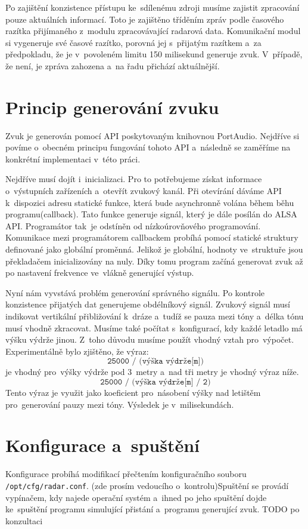 	Po zajištění konzistence přístupu ke~sdílenému zdroji musíme zajistit zpracování pouze aktuálních informací. Toto je zajištěno tříděním zpráv podle časového razítka přijímaného z~modulu zpracovávající radarová data. Komunikační modul si vygeneruje své časové razítko, porovná jej s~přijatým razítkem a~za předpokladu, že je v~povoleném limitu 150 milisekund generuje zvuk. V~případě, že není, je zpráva zahozena a~na řadu přichází aktuálnější.
 	
	\section{Princip generování zvuku}
	Zvuk je generován pomocí API poskytovaným knihovnou PortAudio. Nejdříve si povíme o~obecném principu fungování tohoto API a~následně se zaměříme na konkrétní implementaci v~této práci.\par
	Nejdříve musí dojít i~inicializaci. Pro to potřebujeme získat informace o~výstupních zařízeních a~otevřít zvukový kanál. Při otevírání dáváme API k~dispozici adresu statické funkce, která bude asynchronně volána během běhu programu(callback). Tato funkce generuje signál, který je dále posílán do ALSA API. Programátor tak~je odstíněn od nízkoúrovňového programování. Komunikace mezi programátorem callbackem probíhá pomocí statické struktury definované jako globální proměnná. Jelikož je globální, hodnoty ve~struktuře jsou překladačem inicializovány na nuly. Díky tomu program začíná generovat zvuk až po nastavení frekvence ve~vlákně generující výstup.\par
	Nyní nám vyvstává problém generování správného signálu. Po kontrole konzistence přijatých dat generujeme obdélníkový signál. Zvukový signál musí indikovat vertikální přibližování k~dráze a~tudíž se pauza mezi tóny a~délka tónu musí vhodně zkracovat. Musíme také počítat s~konfigurací, kdy každé letadlo má výšku výdrže jinou. Z~toho důvodu musíme použít vhodný vztah pro~výpočet. Experimentálně bylo zjištěno, že výraz: \[\texttt{25000~/~(výška~výdrže[m])}\] je vhodný pro~výšky výdrže pod 3~metry a~nad tři metry je vhodný výraz níže. \[\texttt{25000~/~(výška~výdrže[m]~/~2)}\]
	Tento výraz je využit jako koeficient pro~násobení výšky nad letištěm pro~generování pauzy mezi tóny. Výsledek je v~milisekundách.
	
	\section{Konfigurace a~spuštění}
	Konfigurace probíhá modifikací přečtením konfiguračního souboru \texttt{/opt/cfg/radar.conf}. (zde prosím vedoucího o~kontrolu)Spuštění se provádí vypínačem, kdy najede operační systém a~ihned po jeho spuštění dojde ke~spuštění programu simulující přistání a~programu generující zvuk.
	TODO po konzultaci
	
